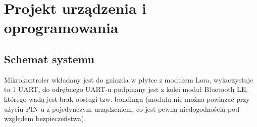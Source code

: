 \chapter{Projekt urządzenia i oprogramowania}
\section{Schemat systemu}
Mikrokontroler wkładany jest do gniazda w płytce z modułem Lora, wykorzystuje to 1 UART, do odrębnego UART-u podpinany jest z kolei moduł Bluetooth LE, którego wadą jest brak obsługi tzw. bondingu (modułu nie można powiązać przy użyciu PIN-u z pojedynczym urządzeniem, co jest pewną niedogodnością pod względem bezpieczeństwa).
